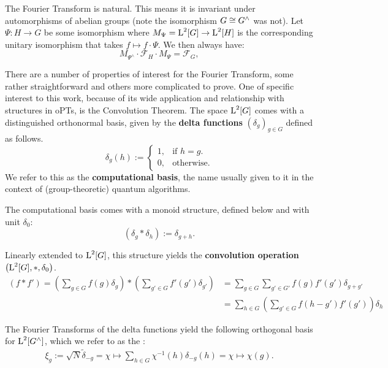 The Fourier Transform is natural.  This means it is invariant under automorphisms of abelian groups (note the isomorphism $G \cong G^\wedge$ was not). Let $\Psi : H \rightarrow G$ be some isomorphism where $M_\Psi = \operatorname{L}^2[G] \rightarrow \operatorname{L}^2[H]$ is the corresponding unitary isomorphism that takes $f\mapsto f\cdot \Psi$. We then always have:
\begin{equation}\label{eqn:FTcanonicity}
  M_{\Psi^\wedge} \cdot \mathcal{F}_H \cdot M_\Psi =  \mathcal{F}_G,
\end{equation}

There are a number of properties of interest for the Fourier Transform, some rather straightforward and others more complicated to prove. One of specific interest to this work, because of its wide application and relationship with structures in oPTs, is the Convolution Theorem. The space $\operatorname{L}^2[G]$ comes with a distinguished orthonormal basis, given by the \textbf{delta functions} $(\delta_g)_{g\in G}$ defined as follows.
\begin{equation}
\label{eqn:computationalBasis}
  \delta_g(h):=\begin{cases}
    1, & \text{if $h=g$}.\\
    0, & \text{otherwise}.
  \end{cases}
\end{equation}
We refer to this as the \textbf{computational basis}, the name usually given to it in the context of (group-theoretic) quantum algorithms.

The computational basis comes with a monoid structure, defined below and with unit $\delta_0$:
\begin{equation}
  \left(\delta_g*\delta_h\right):=\delta_{g+h}.
\end{equation}

Linearly extended to $\operatorname{L}^2[G]$, this structure yields the \textbf{convolution operation} $\left( \operatorname{L}^2[G],*,\delta_0 \right)$.
\begin{align}
\label{eqn:convolutionOperation}
\left(f * f'\right) = \left(\sum_{g\in G} f(g) \delta_g \right) * \left( \sum_{g' \in  G} f'(g') \delta_{g'} \right) &= \sum_{g\in G} \sum_{g'\in G'} f(g) f'(g') \delta_{g+g'} \\ 
&= \sum_{h\in G} \left(\sum_{g'\in G} f(h-g') f'(g')\right) \delta_h
\end{align}

The Fourier Transforms of the delta functions yield the following orthogonal basis for $\operatorname{L}^2[G^\wedge]$, which we refer to as the :
\begin{align*}
\xi_{g} := \sqrt{N}\tilde{\delta}_{-g} = \chi \mapsto \sum_{h \in G}\chi^{-1}(h)\delta_{-g}(h) = \chi \mapsto \chi(g).
\end{align*}

